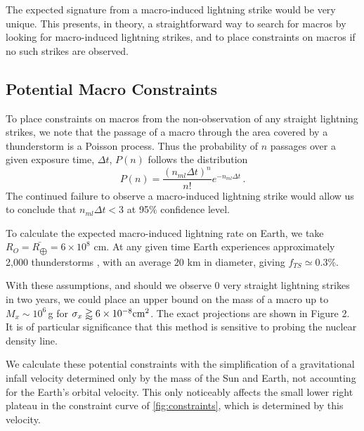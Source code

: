 \documentclass[%
 reprint,
 amsmath,amssymb,
 aps,
]{revtex4-2}
\newcommand{\vtwo}[1]{{\color{black} #1}}
\begin{document}
        The expected signature from a macro-induced lightning strike would be very unique. This presents, in theory, a straightforward way to search for macros by looking for macro-induced lightning strikes, and to place constraints on macros if no such strikes are observed. 


    \subsection{Potential Macro Constraints} %
    \label{sub:macro_constraints_on_earth}

        To place constraints on macros from the non-observation of any straight lightning strikes, we note that the passage of a macro through the area covered by a thunderstorm is a Poisson process. Thus the probability of $n$ passages over a given exposure time, $\Delta t$, $P(n)$ follows the distribution
        \begin{equation}\label{eq:poisson}
            P(n) = \frac{\left({n_{ml} \Delta t}\right)^n}{n!} e^{-n_{ml} \Delta t}\,.
        \end{equation}
        The continued failure to observe a macro-induced lightning strike would allow us to conclude that $n_{ml}\Delta t<3$ at 95$\%$ confidence level.

        To calculate the expected macro-induced lightning rate on Earth, we take $R_{O} = \bar{R_{\bigoplus}} = 6 \times 10^8$ cm. At any given time Earth experiences approximately 2,000 thunderstorms \vtwo{\citep{NatGeo}}, with an average $20$ km in diameter, giving $f_{TS}\simeq 0.3\%$.

        With these assumptions, and should we observe 0 very straight lightning strikes in \vtwo{two} years, we could place an upper bound on the mass of a macro up to $M_x \sim 10^6\,$g for $\sigma_x\gtrapprox6\times10^{-8}{\rm cm}^2$. The exact projections are shown in Figure 2. It is of particular significance that this method is sensitive to probing the nuclear density line.
        
        We calculate these \vtwo{potential} constraints with the simplification of a gravitational infall velocity determined only by the mass of the Sun and Earth, not accounting for the Earth's orbital velocity. This only noticeably affects the small lower right plateau in the constraint curve of \ref{fig:constraints}, which is determined by this velocity.
\end{document}
